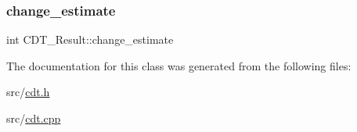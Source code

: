 \subsubsection{\texorpdfstring{change\+\_\+estimate}{change\_estimate}}
{\footnotesize\ttfamily int C\+D\+T\+\_\+\+Result\+::change\+\_\+estimate}



The documentation for this class was generated from the following files\+:\begin{DoxyCompactItemize}
\item 
src/\mbox{\hyperlink{cdt_8h}{cdt.\+h}}\item 
src/\mbox{\hyperlink{cdt_8cpp}{cdt.\+cpp}}\end{DoxyCompactItemize}
